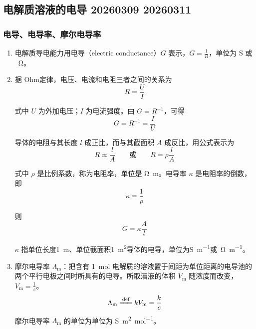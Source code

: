 \subsection{电解质溶液的电导 20260309 20260311}

\subsubsection{电导、电导率、摩尔电导率}

\begin{enumerate}
    \item 电解质导电能力用电导（electric conductance）$G$ 表示，$\displaystyle G = \frac{1}{R}$，单位为 \si{\siemens} 或 \si{\per\ohm}。
    \item 据 Ohm定律，电压、电流和电阻三者之间的关系为
    \begin{equation}
        R = \frac{U}{I}
    \end{equation}

    式中 $U$ 为外加电压；$I$ 为电流强度。由 $G = R^{-1}$，可得
    \begin{equation}
        G = R^{-1} = \frac{I}{U}
    \end{equation}

    导体的电阻与其长度 $l$ 成正比，而与其截面积 $A$ 成反比，用公式表示为
    \begin{equation}
        R \propto \frac{l}{A} \qquad \text{或} \qquad R = \rho \frac{l}{A}
    \end{equation}

    式中 $\rho$ 是比例系数，称为电阻率，单位是 \si{\ohm\m}。电导率 $\kappa$ 是电阻率的倒数，即
    \begin{equation}
        \kappa = \frac{1}{\rho}
    \end{equation}

    则
    \begin{equation}
        G = \kappa \frac{A}{l}
    \end{equation}

   $\kappa$ 指单位长度\qty{1}{\meter}、单位截面积\qty{1}{\meter\squared}导体的电导，单位为\si{\siemens\per\meter}或\si{\per\ohm\per\meter}。

    \item 摩尔电导率 $\Lambda_{\mathrm{m}}$：把含有 \qty{1}{\mole} 电解质的溶液置于间距为单位距离的电导池的两个平行电极之间时所具有的电导。所取溶液的体积 $V_\mathrm{m}$ 随浓度而改变，$\displaystyle V_{\mathrm{m}} = \frac{1}{c}$。
    \begin{equation}
        \Lambda_{\mathrm{m}} \xlongequal{\text{def}} k V_\mathrm{m} = \frac{k}{c}
    \end{equation}
    摩尔电导率 $\Lambda_{\mathrm{m}}$ 的单位为单位为 \si{\siemens\meter\squared\per\mole}。


\end{enumerate}
